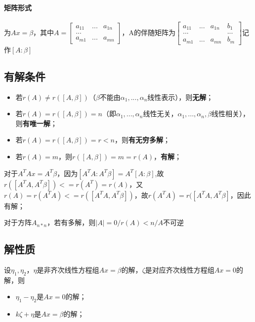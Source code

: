 \paragraph{矩阵形式}
为\(Ax = \beta\)，其中\(A = \begin{bmatrix}
    a_{11} & ... & a_{1n} \\ 
    ... \\ 
    a_{m1} & ... & a_{mn}
\end{bmatrix}\)，A的伴随矩阵为\(\begin{bmatrix}
    a_{11} & ... & a_{1n} & b_1 \\ 
    ... & & & ... \\ 
    a_{m1} & ... & a_{mn} & b_m
\end{bmatrix}\)记作\([A : \beta]\)

\subsection{有解条件}
\begin{itemize}
    \item 若\(r(A) \neq r([A, \beta])\)（\(\beta\)不能由\(\alpha_1, ..., \alpha_n\)线性表示），则\textbf{无解}；
    \item 若\(r(A) = r([A, \beta]) = n\)（即\(\alpha_1, ..., \alpha_n\)线性无关，\(\alpha_1, ..., \alpha_n, \beta\)线性相关），则\textbf{有唯一解}；
    \item 若\(r(A) = r([A, \beta]) = r < n\)，则\textbf{有无穷多解}；
    \item 若\(r(A) = m\)，则\(r([A, \beta]) = m = r(A)\)，\textbf{有解}；
\end{itemize}

对于\(A^TAx = A^T\beta\)，因为\([A^TA : A^T\beta] = A^T[A : \beta]\),故\(r([A^TA, A^T\beta]) <= r(A^T) = r(A)\)，又\(r(A) = r(A^TA) <= r([A^TA, A^T\beta])\)，故\(r(A^TA) = r([A^TA, A^T\beta]\)，因此有解；

对于方阵\(A_{n * n}\)，若有多解，则\(|A| = 0/r(A) < n/A\text{不可逆}\)
\mymatrix

\subsection{解性质}
设\(\eta_1, \eta_2\)，\(\eta\)是非齐次线性方程组\(Ax = \beta\)的解，\(\zeta\)是对应齐次线性方程组\(Ax = 0\)的解，则\begin{itemize}
    \item \(\eta_1 - \eta_2\)是\(Ax = 0\)的解；
    \item \(k\zeta + \eta\)是\(Ax = \beta\)的解；
\end{itemize}

